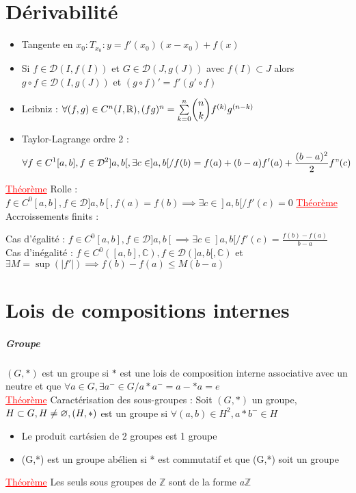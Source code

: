 \documentclass[a4paper, 11pt, french]{article}
\newcommand{\R}{\mathbb{R}}
\newcommand{\C}{\mathbb{C}}
\newcommand{\Z}{\mathbb{Z}}
\newcommand{\D}{\mathcal{D}}
\newcommand{\som}[2]{\overset{#2}{\underset{#1}{\sum}}}
\newcommand{\thm}{\textcolor{red}{\underline{Théorème} }}
\begin{document}
	\section*{Dérivabilité}
	\begin{itemize}
	  \item Tangente en $x_0 : T_{x_0} : y=f'(x_0)(x-x_0)+f(x)$
	  \item Si $f \in \D(I,f(I))$ et $ G \in \D(J,g(J))$ avec $f(I) \subset J$ alors $g\circ f \in \D(I,g(J))$ et $(g\circ f)'=f'(g'\circ f)$
	  \item Leibniz : $\forall (f,g) \in C^n(I,\R), (fg)^n=\som{k=0}{n} \dbinom{n}{k} f^{(k)}g^{(n-k)}$
	  \item Taylor-Lagrange ordre 2 : $$\forall f \in C^1[a,b], f \in \D^2]a,b[, \exists c \in ]a,b[ / f(b)=f(a)+(b-a)f'(a)+\frac{(b-a)^2}{2}f"(c)$$
	\end{itemize}
	 \thm Rolle : $f\in C^0[a,b], f \in \D]a,b[, f(a)=f(b) \implies \exists c \in ]a,b[ / f'(c)=0$
	 \thm Accroissements finits : 
		\begin{center}
			Cas d'égalité : $f\in C^0[a,b], f \in \D]a,b[ \implies \exists c \in ]a,b[ / f'(c)=\frac{f(b)-f(a)}{b-a}$ \\
			Cas d'inégalité : $f\in C^0([a,b],\C), f \in \D(]a,b[,\C)$ et $\exists M=\sup(|f'|) \implies f(b)-f(a)\leqslant M(b-a)$
		\end{center}

	\section*{Lois de compositions internes}
	\subparagraph*{Groupe}
	$(G,*)$ est un groupe si $*$ est une lois de composition interne associative avec un neutre et que $\forall a \in G, \exists a^- \in G / a*a^-=a-*a=e$ \\
	\thm Caractérisation des sous-groupes : Soit $(G,*)$ un groupe, $H \subset G, H \neq \varnothing, \\ (H,*)$ est un groupe si $\forall (a,b) \in H^2, a*b^- \in H$
	\begin{itemize}
	  \item Le produit cartésien de 2 groupes est 1 groupe
	  \item (G,*) est un groupe abélien si * est commutatif et que (G,*) soit un groupe
	\end{itemize}
	 \thm Les seuls sous groupes de $\Z$ sont de la forme $a\Z$
\end{document}
